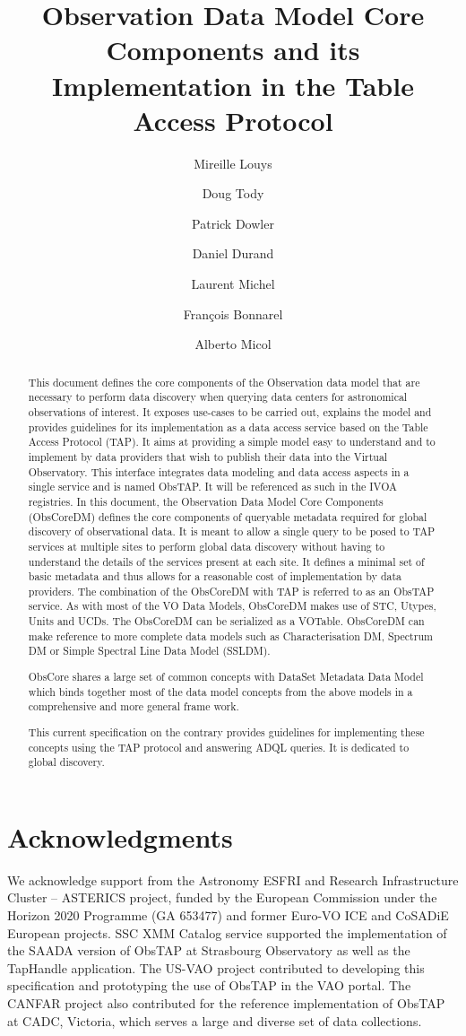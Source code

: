 \documentclass[11pt,a4paper]{ivoa}
\title{Observation Data Model Core Components and its Implementation in the Table Access Protocol}
\author{Mireille Louys}
\author{Doug Tody}
\author[http://www.ivoa.net/twiki/bin/view/IVOA/PatrickDowler]{Patrick Dowler}
\author{Daniel Durand}
\author[http://www.ivoa.net/twiki/bin/view/IVOA/LaurentMichel]
       {Laurent Michel}
\author[http://www.ivoa.net/twiki/bin/view/IVOA/FrancoisBonnarel]
       {Fran\c{c}ois Bonnarel}
\author{Alberto Micol}
\begin{document}
\begin{abstract}
This document defines the core components of the Observation data model that are necessary to perform data discovery
when querying data centers for astronomical observations of interest.  It exposes use-cases to be carried out, explains
the model and provides guidelines for its implementation as a data access service based on the Table Access Protocol
(TAP).  It aims at providing a simple model easy to understand and to implement by data providers that wish to publish
their data into the Virtual Observatory.  This interface integrates data modeling and data access aspects in a single
service and is named ObsTAP. It will be referenced as such in the IVOA registries.  In this document, the Observation
Data Model Core Components (ObsCoreDM) defines the core components of queryable metadata required for global discovery
of observational data.  It is meant to allow a single query to be posed to TAP services at multiple sites to perform
global data discovery without having to understand the details of the services present at each site.  It defines a
minimal set of basic metadata and thus allows for a reasonable cost of implementation by data providers. The
combination of the ObsCoreDM with TAP is referred to as an ObsTAP service.  As with most of the VO Data Models,
ObsCoreDM makes use of STC, Utypes, Units and UCDs.  The ObsCoreDM can be serialized as a VOTable.  ObsCoreDM can make
reference to more complete data models such as Characterisation DM, Spectrum DM or Simple Spectral Line Data Model
(SSLDM).

ObsCore shares a large set of common concepts with DataSet Metadata Data Model \cite{CITATIONCre16l1036} which binds
together most of the data model concepts from the above models in a comprehensive and more general frame work. 

This current specification on the contrary provides guidelines for implementing these concepts using the TAP protocol
and answering ADQL queries. It is dedicated to global discovery.
\end{abstract}


\section*{Acknowledgments}

We acknowledge support from the Astronomy ESFRI and Research Infrastructure Cluster -- ASTERICS project, funded by the
European Commission under the Horizon 2020 Programme (GA 653477) and former Euro-VO ICE and CoSADiE European projects. 
SSC XMM Catalog service supported the implementation of the SAADA version of ObsTAP at Strasbourg Observatory as well
as the TapHandle application. The US-VAO project contributed to developing this specification and prototyping the use
of ObsTAP in the VAO portal.  The CANFAR project also contributed for the reference implementation of ObsTAP at CADC,
Victoria, which serves a large and diverse set of data collections.
\end{document}
